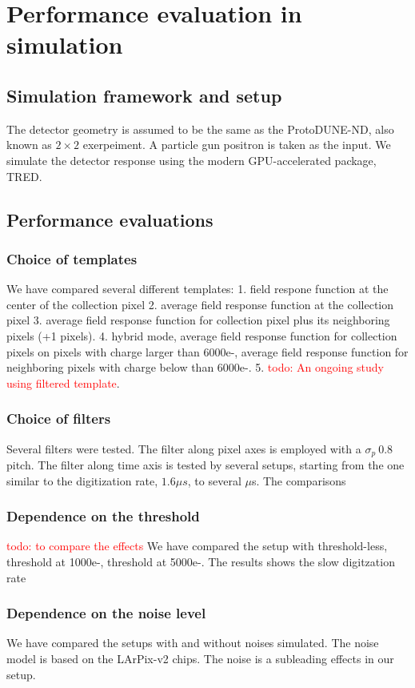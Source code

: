 \documentclass[a4paper,11pt]{article}
\begin{document}
\section{Performance evaluation in simulation}
\subsection{Simulation framework and setup}
The detector geometry is assumed to be the same as the ProtoDUNE-ND, also known as $2\times 2$ exerpeiment. A particle gun positron is taken as the input. We simulate the detector response using the modern GPU-accelerated package, TRED. 
\subsection{Performance evaluations}
\subsubsection{Choice of templates}
We have compared several different templates:
1. field respone function at the center of the collection pixel
2. average field response function at the collection pixel
3. average field response function for collection pixel plus its neighboring pixels (+1 pixels).
4. hybrid mode, average field response function for collection pixels on pixels with charge larger than 6000e-, average field response function for neighboring pixels with charge below than 6000e-.
5. \textcolor{red}{todo: An ongoing study using filtered template}.
\subsubsection{Choice of filters}
Several filters were tested. The filter along pixel axes is employed with a $\sigma_p~0.8$pitch. The filter along time axis is tested by several setups, starting from the one similar to the digitization rate, $1.6\mu s$, to several $\mu$s.
The comparisons

\subsubsection{Dependence on the threshold}
\textcolor{red}{todo: to compare the effects}
We have compared the setup with threshold-less, threshold at 1000e-, threshold at 5000e-. The results shows the slow digitzation rate 
\subsubsection{Dependence on the noise level}
We have compared the setups with and without noises simulated. The noise model is based on the LArPix-v2 chips. The noise is a subleading effects in our setup.
\end{document}
